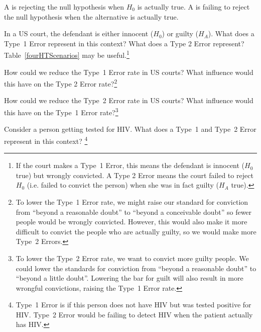 A  is rejecting the null hypothesis when $H_0$ is actually true. A  is failing to reject the null hypothesis when the alternative is actually true.

\begin{exercise} \label{whatAreTheErrorTypesInUSCourts}
In a US court, the defendant is either innocent ($H_0$) or  guilty ($H_A$). What does a Type~1 Error represent in this context? What does a Type 2 Error represent? Table~\ref{fourHTScenarios} may be useful.\footnote{If the court makes a Type~1 Error, this means the defendant is innocent ($H_0$ true) but wrongly convicted. A Type 2 Error means the court failed to reject $H_0$ (i.e. failed to convict the person) when she was in fact guilty ($H_A$ true).}
\end{exercise}

\begin{exercise} \label{howToReduceType1ErrorsInUSCourts}
How could we reduce the Type~1 Error rate in US courts? What influence would this have on the Type 2 Error rate?\footnote{To lower the Type~1 Error rate, we might raise our standard for conviction from ``beyond a reasonable doubt'' to ``beyond a conceivable doubt'' so fewer people would be wrongly convicted. However, this would also make it more difficult to convict the people who are actually guilty, so we would make more Type~2 Errors.}
\end{exercise}

\begin{exercise} \label{howToReduceType2ErrorsInUSCourts}
How could we reduce the Type~2 Error rate in US courts? What influence would this have on the Type~1 Error rate?\footnote{To lower the Type~2 Error rate, we want to convict more guilty people. We could lower the standards for conviction from ``beyond a reasonable doubt'' to ``beyond a little doubt''. Lowering the bar for guilt will also result in more wrongful convictions, raising the Type~1 Error rate.}
\end{exercise}

\begin{exercise} \label{errorsinHIVTesting}
Consider a person getting tested for HIV. What does a Type~1 and Type~2 Error represent in this context? \footnote{Type~1 Error is if this person does not have HIV but was tested positive for HIV. Type~2 Error would be failing to detect HIV when the patient actually has HIV. }
\end{exercise}


